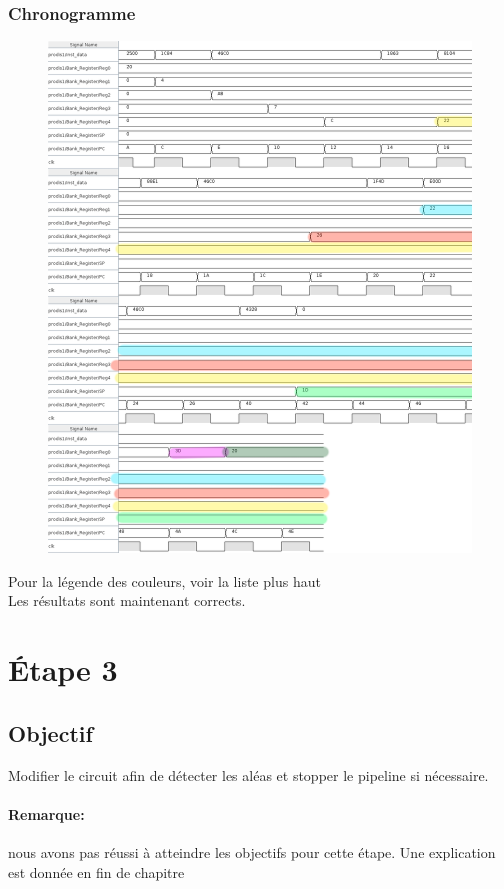 \documentclass[a4paper]{article} %
\begin{document}
\subsubsection{Chronogramme}
\begin{figure}[H]
    \centering
    \includegraphics[width=.8\textwidth]{src/CHRONO_ET2_V3_COL.png}
    \label{fig:chrono_et2_corr_pic}
\end{figure}
Pour la légende des couleurs, voir la liste plus haut \\
Les résultats sont maintenant corrects.
\section{Étape 3}
\subsection{Objectif}
Modifier le circuit afin de détecter les aléas et stopper le pipeline si nécessaire.
\paragraph{Remarque:}nous avons pas réussi à atteindre les objectifs pour cette étape. Une explication est donnée en fin de chapitre
\end{document}
